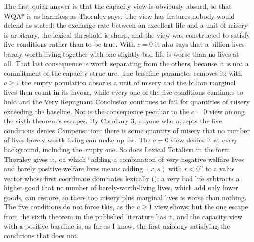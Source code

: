 \documentclass[
  11pt,
  letterpaper,
  DIV=11,
  numbers=noendperiod,
  twoside]{scrartcl}
\begin{document}
The first quick answer is that the capacity view is obviously absurd, so
that WQA* is as harmless as Thornley says. The view has features nobody
would defend as stated: the exchange rate between an excellent life and
a unit of misery is arbitrary, the lexical threshold is sharp, and the
view was constructed to satisfy five conditions rather than to be true.
With \(c = 0\) it also says that a billion lives barely worth living
together with one slightly bad life is worse than no lives at all. That
last consequence is worth separating from the others, because it is not
a commitment of the capacity structure. The baseline parameter removes
it: with \(c \geq 1\) the empty population absorbs a unit of misery and
the billion marginal lives then count in its favour, while every one of
the five conditions continues to hold and the Very Repugnant Conclusion
continues to fail for quantities of misery exceeding the baseline. Nor
is the consequence peculiar to the \(c = 0\) view among the sixth
theorem's escapes. By Corollary 3, anyone who accepts the five
conditions denies Compensation: there is some quantity of misery that no
number of lives barely worth living can make up for. The \(c = 0\) view
denies it at every background, including the empty one. So does Lexical
Totalism in the form Thornley gives it, on which ``adding a combination
of very negative welfare lives and barely positive welfare lives means
adding \((r, s)\) with \(r < 0\)'' to a value vector whose first
coordinate dominates lexically (): a very bad life subtracts a higher good that no number
of barely-worth-living lives, which add only lower goods, can restore,
so there too misery plus marginal lives is worse than nothing. The five
conditions do not force this, as the \(c \geq 1\) view shows; but the
one escape from the sixth theorem in the published literature has it,
and the capacity view with a positive baseline is, as far as I know, the
first axiology satisfying the conditions that does not.
\end{document}
